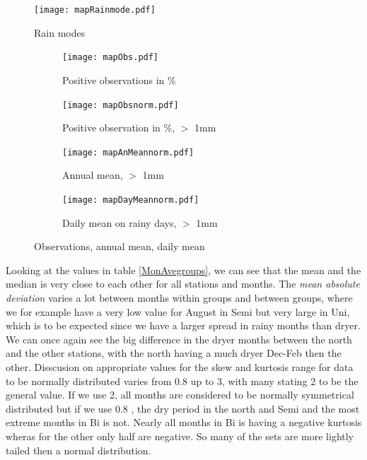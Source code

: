 \documentclass{article}
\begin{document}
		\begin{figure}
			\centering
			\texttt{[image: mapRainmode.pdf]}
			\caption{Rain modes}
			\label{mapRainmode}
		\end{figure}
		\begin{figure}[H]
		\centering
		\begin{subfigure}{0.4\linewidth}
			\centering
			\texttt{[image: mapObs.pdf]}
			\caption{Positive observations in \%}
		\end{subfigure}%
		\begin{subfigure}{0.4\linewidth}
			\centering
			\texttt{[image: mapObsnorm.pdf]}
			\caption{Positive observation in \%, $>$ 1mm}
		\end{subfigure}
		\begin{subfigure}{0.4\linewidth}
			\centering
			\texttt{[image: mapAnMeannorm.pdf]}
			\caption{Annual mean, $>$ 1mm}
		\end{subfigure}%
		\begin{subfigure}{0.4\linewidth}
			\centering
			\texttt{[image: mapDayMeannorm.pdf]}
			\caption{Daily mean on rainy days, $>$ 1mm}
		\end{subfigure}
		\caption{Observations, annual mean, daily mean}
		\label{maps}
	\end{figure}
	Looking at the values in table \ref{MonAvegroups}, we can see that the mean and the median is very close to each other for all stations and months. The \textit{mean absolute deviation} varies a lot between months within groups and between groups, where we for example have a very low value for August in Semi but very large in Uni, which is to be expected since we have a larger spread in rainy months than dryer. We can once again see the big difference in the dryer months between the north and the other stations, with the north having a much dryer Dec-Feb then the other. Disscusion on appropriate values for the skew and kurtosis range for data to be normally distributed varies from 0.8 up to 3, with many stating 2 to be the general value. If we use 2, all months are considered to be normally symmetrical distributed but if we use 0.8 , the dry period in the north and Semi and the most extreme months in Bi is not. Nearly all months in Bi is having a negative kurtosis wheras for the other only half are negative. So many of the sets are more lightly tailed then a normal distribution.\\
	
\end{document}
